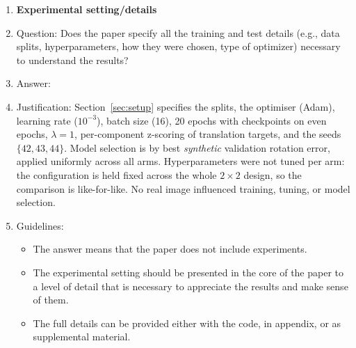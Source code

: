\begin{enumerate}
\item {\bf Experimental setting/details}
    \item[] Question: Does the paper specify all the training and test details (e.g., data splits, hyperparameters, how they were chosen, type of optimizer) necessary to understand the results?
    \item[] Answer: \answerYes{}
    \item[] Justification: Section~\ref{sec:setup} specifies the splits, the optimiser (Adam), learning rate
    ($10^{-3}$), batch size (16), 20 epochs with checkpoints on even epochs, $\lambda{=}1$,
    per-component z-scoring of translation targets, and the seeds $\{42,43,44\}$. Model
    selection is by best \emph{synthetic} validation rotation error, applied uniformly across
    all arms. Hyperparameters were not tuned per arm: the configuration is held fixed across
    the whole $2{\times}2$ design, so the comparison is like-for-like. No real image
    influenced training, tuning, or model selection.
    \item[] Guidelines:
    \begin{itemize}
        \item The answer \answerNA{} means that the paper does not include experiments.
        \item The experimental setting should be presented in the core of the paper to a level of detail that is necessary to appreciate the results and make sense of them.
        \item The full details can be provided either with the code, in appendix, or as supplemental material.
    \end{itemize}


\end{enumerate}
